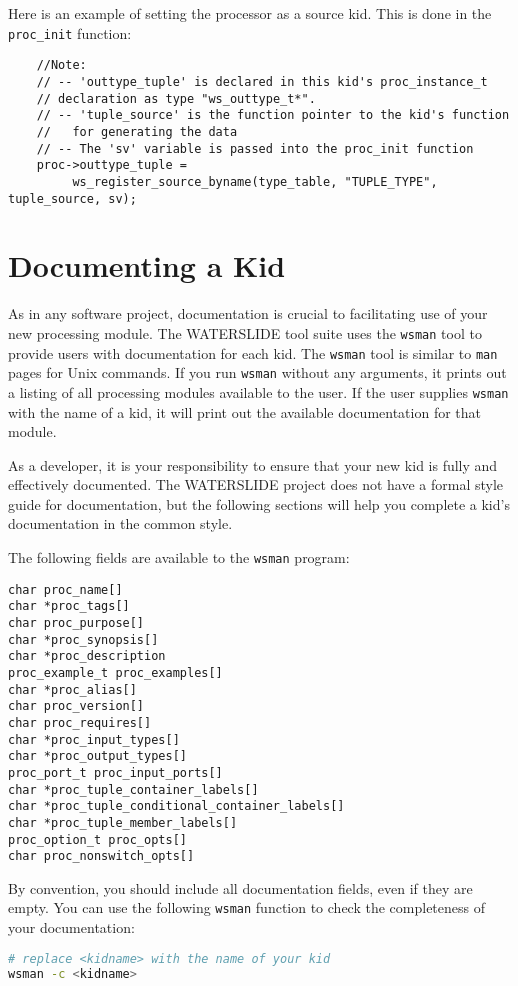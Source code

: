 \documentclass[11pt]{article}
\begin{document}
Here is an example of setting the processor as a source kid.  This is done in
the \texttt{proc\_init} function:

\begin{lstlisting}
    //Note: 
    // -- 'outtype_tuple' is declared in this kid's proc_instance_t
    // declaration as type "ws_outtype_t*".
    // -- 'tuple_source' is the function pointer to the kid's function
    //   for generating the data
    // -- The 'sv' variable is passed into the proc_init function
    proc->outtype_tuple =
         ws_register_source_byname(type_table, "TUPLE_TYPE", tuple_source, sv);

\end{lstlisting}

\section {Documenting a Kid}
As in any software project, documentation is crucial to facilitating use of your new processing module. The WATERSLIDE tool
suite uses the \texttt{wsman} tool to provide users with documentation for
each kid. The \texttt{wsman} tool is similar to \texttt{man} pages for Unix commands. If you run \texttt{wsman}
without any arguments, it prints out a listing of all processing modules available to the user. If the user supplies
\texttt{wsman} with the name of a kid, it will print out the available documentation for that module.

As a developer, it is your responsibility to ensure that your new kid is fully and effectively documented. The WATERSLIDE
project does not have a formal style guide for documentation, but the following sections will help you complete a kid's
documentation in the common style.

The following fields are available to the \texttt{wsman} program:
\begin{lstlisting}
char proc_name[]
char *proc_tags[]
char proc_purpose[]
char *proc_synopsis[]
char *proc_description
proc_example_t proc_examples[]
char *proc_alias[]
char proc_version[]
char proc_requires[]
char *proc_input_types[]
char *proc_output_types[]
proc_port_t proc_input_ports[]
char *proc_tuple_container_labels[]
char *proc_tuple_conditional_container_labels[]
char *proc_tuple_member_labels[]
proc_option_t proc_opts[]
char proc_nonswitch_opts[]
\end{lstlisting}

By convention, you should include all documentation fields, even if they are empty. You can use the following 
\texttt{wsman} function to check the completeness of your documentation:
\begin{lstlisting}[language=bash]
# replace <kidname> with the name of your kid
wsman -c <kidname>
\end{lstlisting}
\end{document}

